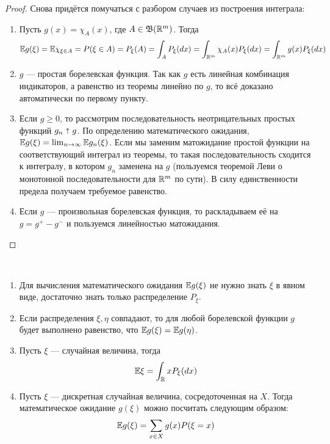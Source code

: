 \begin{proof}
	Снова придётся помучаться с разбором случаев из построения интеграла:
	\begin{enumerate}
		\item Пусть $g(x) = \chi_A(x)$, где $A \in \mathfrak{B}(\mathbb{R}^m)$. Тогда
		\[
			\mathbb{E} g(\xi) = \mathbb{E} \chi_{\xi \in A} = P(\xi \in A) = P_\xi(A) = \int_A P_\xi(dx) = \int_{\mathbb{R}^m} \chi_A(x)P_\xi(dx) = \int_{\mathbb{R}^m} g(x)P_\xi(dx)
		\]
		
		\item $g$ --- простая борелевская функция. Так как $g$ есть линейная комбинация индикаторов, а равенство из теоремы линейно по $g$, то всё доказано автоматически по первому пункту.
		
		\item Если $g \ge 0$, то рассмотрим последовательность неотрицательных простых функций $g_n \shortuparrow g$. По определению математического ожидания, $\mathbb{E} g(\xi) = \lim_{n \to \infty} \mathbb{E} g_n(\xi)$. Если мы заменим матожидание простой функции на соответствующий интеграл из теоремы, то такая последовательность сходится к интегралу, в котором $g_n$ заменена на $g$ (пользуемся теоремой Леви о монотонной последовательности для $\mathbb{R}^m$ по сути). В силу единственности предела получаем требуемое равенство.
		
		\item Если $g$ --- произвольная борелевская функция, то раскладываем её на $g = g^+ - g^-$ и пользуемся линейностью матожидания.
	\end{enumerate}
\end{proof}

\begin{corollary}~
	\begin{enumerate}
		\item Для вычисления математического ожидания $\mathbb{E} g(\xi)$ не нужно знать $\xi$ в явном виде, достаточно знать только распределение $P_\xi$.
		
		\item Если распределения $\xi, \eta$ совпадают, то для любой борелевской функции $g$ будет выполнено равенство, что $\mathbb{E} g(\xi) = \mathbb{E} g(\eta)$.
		
		\item Пусть $\xi$ --- случайная величина, тогда
		\[
			\mathbb{E}\xi = \int_{\mathbb{R}} xP_\xi(dx)
		\]
		
		\item Пусть $\xi$ --- дискретная случайная величина, сосредоточенная на $X$. Тогда математическое ожидание $g(\xi)$ можно посчитать следующим образом:
		\[
			\mathbb{E} g(\xi) = \sum_{x \in X} g(x)P(\xi = x)
		\]
	\end{enumerate}
\end{corollary}


